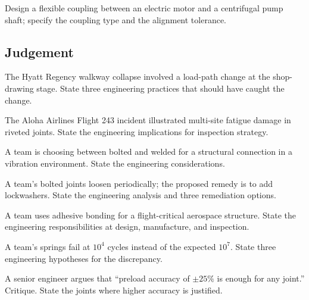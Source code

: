\begin{exercise}
Design a flexible coupling between an electric motor and a centrifugal pump shaft; specify the coupling type and the alignment tolerance.
\end{exercise}

\subsection*{Judgement}

\begin{exercise}
The Hyatt Regency walkway collapse \cite{acc:nbs-hyatt-1982} involved a load-path change at the shop-drawing stage. State three engineering practices that should have caught the change.
\end{exercise}

\begin{exercise}
The Aloha Airlines Flight 243 incident \cite{acc:ntsb-aar94-04} illustrated multi-site fatigue damage in riveted joints. State the engineering implications for inspection strategy.
\end{exercise}

\begin{exercise}
A team is choosing between bolted and welded for a structural connection in a vibration environment. State the engineering considerations.
\end{exercise}

\begin{exercise}
A team's bolted joints loosen periodically; the proposed remedy is to add lockwashers. State the engineering analysis and three remediation options.
\end{exercise}

\begin{exercise}
A team uses adhesive bonding for a flight-critical aerospace structure. State the engineering responsibilities at design, manufacture, and inspection.
\end{exercise}

\begin{exercise}
A team's springs fail at $10^4$ cycles instead of the expected $10^7$. State three engineering hypotheses for the discrepancy.
\end{exercise}

\begin{exercise}
A senior engineer argues that ``preload accuracy of $\pm 25\%$ is enough for any joint.'' Critique. State the joints where higher accuracy is justified.
\end{exercise}

